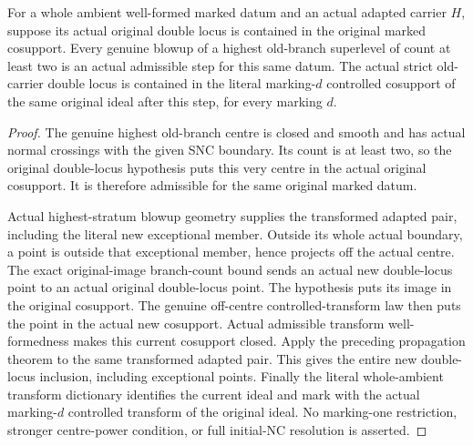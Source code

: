 \begin{theorem}
\label{hir:general-nc-actual-highest-step-any-mark-double-cosupport}
For a whole ambient well-formed marked datum and an actual adapted
carrier $H$, suppose its actual original double locus is contained in
the original marked cosupport. Every genuine blowup of a highest
old-branch superlevel of count at least two is an actual admissible
step for this same datum. The actual strict old-carrier double locus
is contained in the literal marking-$d$ controlled cosupport of the
same original ideal after this step, for every marking $d$.
\leanok
\end{theorem}
\begin{proof}
The genuine highest old-branch centre is closed and smooth and has
actual normal crossings with the given SNC boundary. Its count is
at least two, so the original double-locus hypothesis puts this very
centre in the actual original cosupport. It is therefore admissible
for the same original marked datum.

Actual highest-stratum blowup geometry supplies the transformed
adapted pair, including the literal new exceptional member. Outside
its whole actual boundary, a point is outside that exceptional
member, hence projects off the actual centre. The exact original-image
branch-count bound sends an actual new double-locus point to an
actual original double-locus point. The hypothesis puts its image
in the original cosupport. The genuine off-centre controlled-transform
law then puts the point in the actual new cosupport. Actual admissible
transform well-formedness makes this current cosupport closed.
Apply the preceding propagation theorem to the same transformed
adapted pair. This gives the entire new double-locus inclusion,
including exceptional points. Finally the literal whole-ambient
transform dictionary identifies the current ideal and mark with the
actual marking-$d$ controlled transform of the original ideal.
No marking-one restriction, stronger centre-power condition, or
full initial-NC resolution is asserted.
\end{proof}
